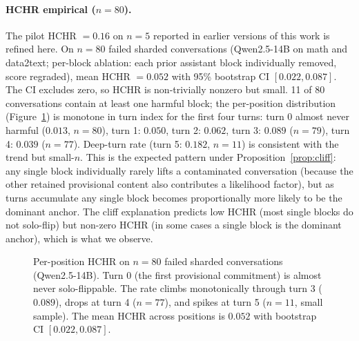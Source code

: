 \documentclass{article}
\begin{document}
\paragraph{HCHR empirical ($n{=}80$).}
The pilot HCHR $= 0.16$ on $n{=}5$ reported in earlier versions of this work is refined here. On $n{=}80$ failed sharded conversations (Qwen2.5-14B on math and data2text; per-block ablation: each prior assistant block individually removed, score regraded), mean HCHR $= 0.052$ with 95\% bootstrap CI $[0.022, 0.087]$. The CI excludes zero, so HCHR is non-trivially nonzero but small. 11 of 80 conversations contain at least one harmful block; the per-position distribution (Figure~\ref{fig:hchr-position}) is monotone in turn index for the first four turns: turn 0 almost never harmful ($0.013$, $n{=}80$), turn 1: $0.050$, turn 2: $0.062$, turn 3: $0.089$ ($n{=}79$), turn 4: $0.039$ ($n{=}77$). Deep-turn rate (turn 5: $0.182$, $n{=}11$) is consistent with the trend but small-$n$. This is the expected pattern under Proposition~\ref{prop:cliff}: any single block individually rarely lifts a contaminated conversation (because the other retained provisional content also contributes a likelihood factor), but as turns accumulate any single block becomes proportionally more likely to be the dominant anchor. The cliff explanation predicts low HCHR (most single blocks do not solo-flip) but non-zero HCHR (in some cases a single block is the dominant anchor), which is what we observe.

\begin{figure}[h]
\centering
{}
\caption{Per-position HCHR on $n{=}80$ failed sharded conversations (Qwen2.5-14B). Turn 0 (the first provisional commitment) is almost never solo-flippable. The rate climbs monotonically through turn 3 ($0.089$), drops at turn 4 ($n{=}77$), and spikes at turn 5 ($n{=}11$, small sample). The mean HCHR across positions is $0.052$ with bootstrap CI $[0.022, 0.087]$.}
\label{fig:hchr-position}
\end{figure}
\end{document}
